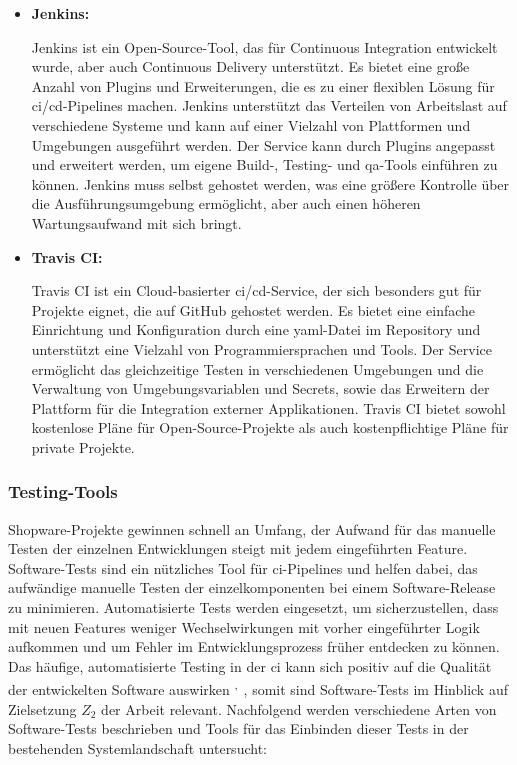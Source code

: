 \begin{itemize}
    \item{
        \textbf{Jenkins:}\par
        Jenkins ist ein Open-Source-Tool, das für Continuous Integration entwickelt wurde, aber auch Continuous Delivery
        unterstützt.
        Es bietet eine große Anzahl von Plugins und Erweiterungen, die es zu einer flexiblen Lösung für
        \acrshort{ci}/\acrshort{cd}-Pipelines machen.
        Jenkins unterstützt das Verteilen von Arbeitslast auf verschiedene Systeme und kann auf einer Vielzahl von
        Plattformen und Umgebungen ausgeführt werden.
        Der Service kann durch Plugins angepasst und erweitert werden, um eigene Build-, Testing- und
        \acrshort{qa}-Tools einführen zu können.
        Jenkins muss selbst gehostet werden, was eine größere Kontrolle über die Ausführungsumgebung ermöglicht, aber
        auch einen höheren Wartungsaufwand mit sich bringt.
    }

    \item{
        \textbf{Travis CI:}\par
        Travis CI ist ein Cloud-basierter \acrshort{ci}/\acrshort{cd}-Service, der sich besonders gut für Projekte
        eignet, die auf GitHub gehostet werden.
        Es bietet eine einfache Einrichtung und Konfiguration durch eine \acrshort{yaml}-Datei im Repository und
        unterstützt eine Vielzahl von Programmiersprachen und Tools.
        Der Service ermöglicht das gleichzeitige Testen in verschiedenen Umgebungen und die Verwaltung von
        Umgebungsvariablen und Secrets, sowie das Erweitern der Plattform für die Integration externer Applikationen.
        Travis CI bietet sowohl kostenlose Pläne für Open-Source-Projekte als auch kostenpflichtige Pläne für private
        Projekte.
    }
\end{itemize}

\subsubsection{Testing-Tools}

Shopware-Projekte gewinnen schnell an Umfang, der Aufwand für das manuelle Testen der einzelnen Entwicklungen steigt mit
jedem eingeführten Feature.
Software-Tests sind ein nützliches Tool für \acrshort{ci}-Pipelines und helfen dabei, das aufwändige manuelle Testen
der einzelkomponenten bei einem Software-Release zu minimieren.
Automatisierte Tests werden eingesetzt, um sicherzustellen, dass mit neuen Features weniger Wechselwirkungen mit vorher
eingeführter Logik aufkommen und um Fehler im Entwicklungsprozess früher entdecken zu können.
Das häufige, automatisierte Testing in der \acrshort{ci} kann sich positiv auf die Qualität der entwickelten
Software auswirken
\textsuperscript{,\ }, somit sind
Software-Tests im Hinblick auf Zielsetzung $Z_2$ der Arbeit relevant.
Nachfolgend werden verschiedene Arten von Software-Tests beschrieben und Tools für das Einbinden dieser Tests in der
bestehenden Systemlandschaft untersucht:

